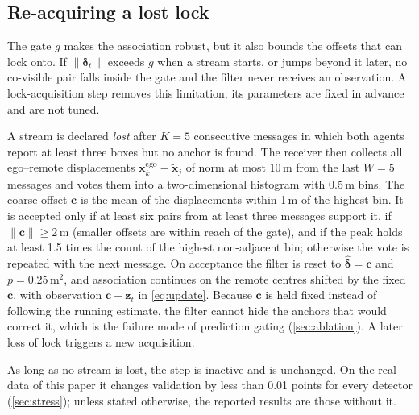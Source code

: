 \subsection{Re-acquiring a lost lock}
\label{sec:acq}
The gate $g$ makes the association robust, but it also bounds the offsets that \method can lock onto.
If $\|\boldsymbol\delta_t\|$ exceeds $g$ when a stream starts, or jumps beyond it later, no co-visible pair falls inside the gate and the filter never receives an observation.
A lock-acquisition step removes this limitation; its parameters are fixed in advance and are not tuned.

A stream is declared \emph{lost} after $K=5$ consecutive messages in which both agents report at least three boxes but no anchor is found.
The receiver then collects all ego--remote displacements $\mathbf x^{\text{ego}}_k-\tilde{\mathbf x}_j$ of norm at most 10\,m from the last $W=5$ messages and votes them into a two-dimensional histogram with 0.5\,m bins.
The coarse offset $\mathbf c$ is the mean of the displacements within 1\,m of the highest bin.
It is accepted only if at least six pairs from at least three messages support it, if $\|\mathbf c\|\ge2$\,m (smaller offsets are within reach of the gate), and if the peak holds at least 1.5 times the count of the highest non-adjacent bin; otherwise the vote is repeated with the next message.
On acceptance the filter is reset to $\hat{\boldsymbol\delta}=\mathbf c$ and $p=0.25$\,m$^2$, and association continues on the remote centres shifted by the fixed $\mathbf c$, with observation $\mathbf c+\bar{\mathbf z}_t$ in \cref{eq:update}.
Because $\mathbf c$ is held fixed instead of following the running estimate, the filter cannot hide the anchors that would correct it, which is the failure mode of prediction gating (\cref{sec:ablation}).
A later loss of lock triggers a new acquisition.

As long as no stream is lost, the step is inactive and \method is unchanged.
On the real data of this paper it changes validation \apseven by less than 0.01 points for every detector (\cref{sec:stress}); unless stated otherwise, the reported results are those without it.

